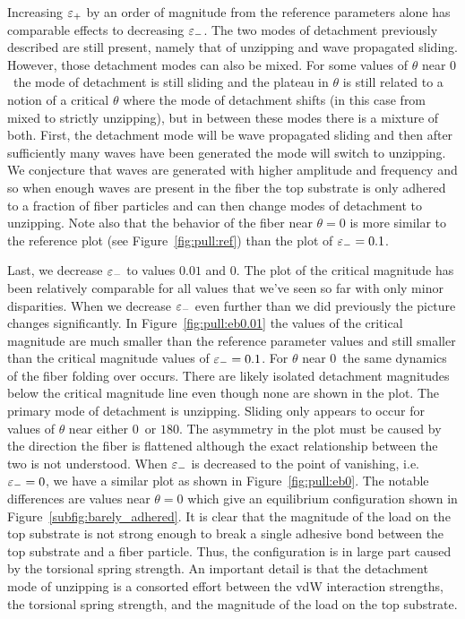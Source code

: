 Increasing $\varepsilon_+$ by an order of magnitude from the reference parameters alone has comparable effects to decreasing $\varepsilon_-$. The two modes of detachment previously described are still present, namely that of unzipping and wave propagated sliding. However, those detachment modes can also be mixed. For some values of $\theta$ near $0$\textdegree\ the mode of detachment is still sliding and the plateau in $\theta$ is still related to a notion of a critical $\theta$ where the mode of detachment shifts (in this case from mixed to strictly unzipping), but in between these modes there is a mixture of both. First, the detachment mode will be wave propagated sliding and then after sufficiently many waves have been generated the mode will switch to unzipping. We conjecture that waves are generated with higher amplitude and frequency and so when enough waves are present in the fiber the top substrate is only adhered to a fraction of fiber particles and can then change modes of detachment to unzipping. Note also that the behavior of the fiber near $\theta=0$ is more similar to the reference plot (see Figure~\ref{fig:pull:ref}) than the plot of $\varepsilon_-=0.1$.

Last, we decrease $\varepsilon_-$ to values $0.01$ and $0$. The plot of the critical magnitude has been relatively comparable for all values that we've seen so far with only minor disparities. When we decrease $\varepsilon_-$ even further than we did previously the picture changes significantly. In Figure~\ref{fig:pull:eb0.01} the values of the critical magnitude are much smaller than the reference parameter values and still smaller than the critical magnitude values of $\varepsilon_-=0.1$. For $\theta$ near $0$\textdegree\ the same dynamics of the fiber folding over occurs. There are likely isolated detachment magnitudes below the critical magnitude line even though none are shown in the plot. The primary mode of detachment is unzipping. Sliding only appears to occur for values of $\theta$ near either $0$\textdegree\ or $180$\textdegree. The asymmetry in the plot must be caused by the direction the fiber is flattened although the exact relationship between the two is not understood. When $\varepsilon_-$ is decreased to the point of vanishing, i.e. $\varepsilon_-=0$, we have a similar plot as shown in Figure~\ref{fig:pull:eb0}. The notable differences are values near $\theta=0$ which give an equilibrium configuration shown in Figure~\ref{subfig:barely_adhered}. It is clear that the magnitude of the load on the top substrate is not strong enough to break a single adhesive bond between the top substrate and a fiber particle. Thus, the configuration is in large part caused by the torsional spring strength. An important detail is that the detachment mode of unzipping is a consorted effort between the vdW interaction strengths, the torsional spring strength, and the magnitude of the load on the top substrate.

